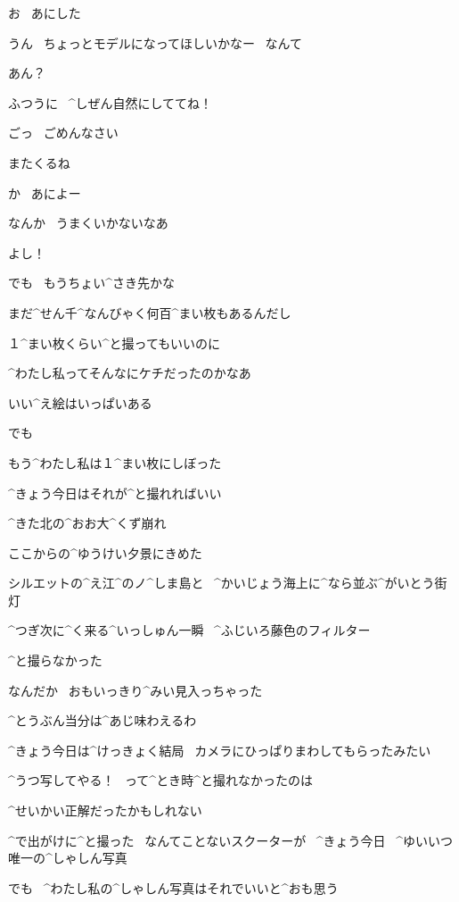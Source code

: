 \Ojisan お
\ あにした

\Alpha うん
\ ちょっとモデルになってほしいかなー
\ なんて

\Ojisan あん？

\Alpha ふつうに
\ ^{しぜん}{自然}にしててね！

\page
\Alpha ごっ
\ ごめんなさい

\Alpha またくるね

\Ojisan か
\ あによー

\Alpha なんか
\ うまくいかないなあ

\page
\Alpha よし！

\Alpha でも
\ もうちょい^{さき}{先}かな

\page
\Alpha まだ^{せん}{千}^{なんびゃく}{何百}^{まい}{枚}もあるんだし

\Alpha １^{まい}{枚}くらい^{と}{撮}ってもいいのに

\Alpha ^{わたし}{私}ってそんなにケチだったのかなあ

\page
\Alpha いい^{え}{絵}はいっぱいある

\Alpha でも

\Alpha もう^{わたし}{私}は１^{まい}{枚}にしぼった

\Alpha ^{きょう}{今日}はそれが^{と}{撮}れればいい

\page
\Alpha ^{きた}{北}の^{おお}{大}^{くず}{崩}れ

\Alpha ここからの^{ゆうけい}{夕景}にきめた

\Alpha シルエットの^{え}{江}^{の}{ノ}^{しま}{島}と
\ ^{かいじょう}{海上}に^{なら}{並}ぶ^{がいとう}{街灯}

\Alpha ^{つぎ}{次}に^{く}{来}る^{いっしゅん}{一瞬}
\ ^{ふじいろ}{藤色}のフィルター

\page[80]
\Alpha ^{と}{撮}らなかった

\Alpha なんだか
\ おもいっきり^{みい}{見入}っちゃった

\Alpha ^{とうぶん}{当分}は^{あじ}{味}わえるわ

\page
\Alpha ^{きょう}{今日}は^{けっきょく}{結局}
\ カメラにひっぱりまわしてもらったみたい

\Alpha ^{うつ}{写}してやる！
\ って^{とき}{時}^{と}{撮}れなかったのは

\Alpha ^{せいかい}{正解}だったかもしれない

\page
\Alpha ^{で}{出}がけに^{と}{撮}った
\ なんてことないスクーターが
\ ^{きょう}{今日}
\ ^{ゆいいつ}{唯一}の^{しゃしん}{写真}

\Alpha でも
\ ^{わたし}{私}の^{しゃしん}{写真}はそれでいいと^{おも}{思}う

